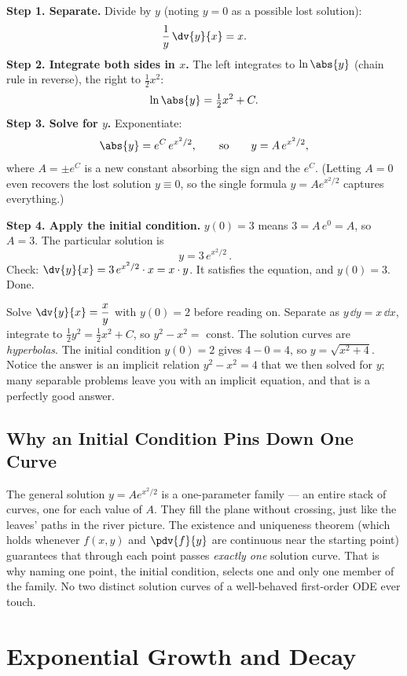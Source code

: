 \textbf{Step 1. Separate.} Divide by $y$ (noting $y=0$ as a possible lost solution):
\[
  \frac{1}{y}\,\dv{y}{x} = x.
\]
\textbf{Step 2. Integrate both sides in $x$.} The left integrates to $\ln\abs{y}$
(chain rule in reverse), the right to $\tfrac12 x^2$:
\[
  \ln\abs{y} = \tfrac12 x^2 + C.
\]
\textbf{Step 3. Solve for $y$.} Exponentiate:
\[
  \abs{y} = e^{C}\,e^{x^2/2}, \qquad\text{so}\qquad y = A\,e^{x^2/2},
\]
where $A=\pm e^{C}$ is a new constant absorbing the sign and the $e^C$. (Letting
$A=0$ even recovers the lost solution $y\equiv 0$, so the single formula
$y=Ae^{x^2/2}$ captures everything.)

\textbf{Step 4. Apply the initial condition.} $y(0)=3$ means $3 = A\,e^{0}=A$, so
$A=3$. The particular solution is
\[
  \boxed{\,y = 3\,e^{x^2/2}\,}.
\]
Check: $\dv{y}{x} = 3\,e^{x^2/2}\cdot x = x\cdot y$. It satisfies the equation, and
$y(0)=3$. Done.

\begin{labbox}
Solve $\dv{y}{x} = \dfrac{x}{y}$ with $y(0)=2$ before reading on. Separate as
$y\,\dd y = x\,\dd x$, integrate to $\tfrac12 y^2 = \tfrac12 x^2 + C$, so
$y^2 - x^2 = $ const. The solution curves are \emph{hyperbolas}. The initial
condition $y(0)=2$ gives $4 - 0 = 4$, so $y = \sqrt{x^2+4}$. Notice the answer is an
implicit relation $y^2-x^2=4$ that we then solved for $y$; many separable problems
leave you with an implicit equation, and that is a perfectly good answer.
\end{labbox}

\subsection{Why an Initial Condition Pins Down One Curve}

\begin{connectionbox}
The general solution $y=Ae^{x^2/2}$ is a one-parameter family --- an entire stack of
curves, one for each value of $A$. They fill the plane without crossing, just like
the leaves' paths in the river picture. The existence and uniqueness theorem (which
holds whenever $f(x,y)$ and $\pdv{f}{y}$ are continuous near the starting point)
guarantees that through each point passes \emph{exactly one} solution curve. That is
why naming one point, the initial condition, selects one and only one member of the
family. No two distinct solution curves of a well-behaved first-order ODE ever
touch.
\end{connectionbox}

\section{Exponential Growth and Decay}


